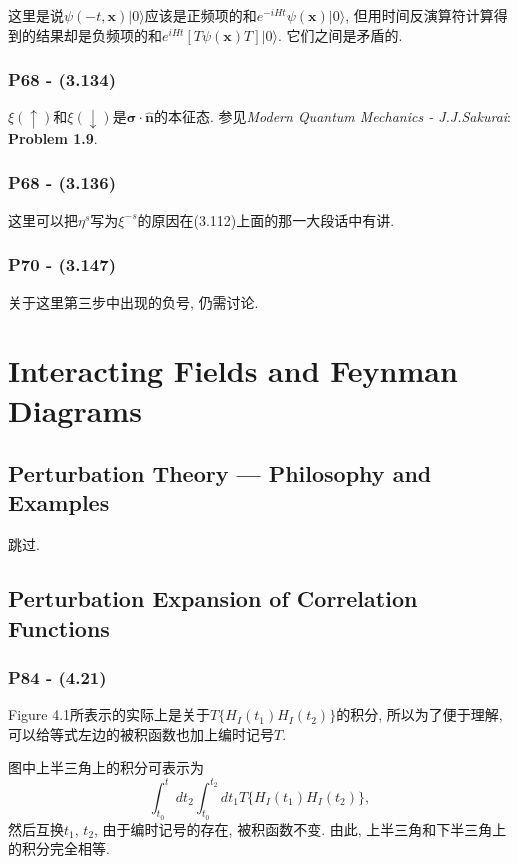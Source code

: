\documentclass[cn,hazy,green,11pt,device=normal,chinesefont=founder]{elegantnote}
\begin{document}
这里是说$\psi(-t, \mathbf{x})|0\rangle$应该是正频项的和$e^{-iHt}\psi(\mathbf{x})|0\rangle$, 但用时间反演算符计算得到的结果却是负频项的和$e^{iHt}[T\psi(\mathbf{x})T]|0\rangle$. 它们之间是矛盾的. 

\subsubsection{P68 - (3.134)}

$\xi(\uparrow)$和$\xi(\downarrow)$是$\boldsymbol{\sigma}\cdot\mathbf{\hat{n}}$的本征态. 参见\textit{Modern Quantum Mechanics - J.J.Sakurai}: \textbf{Problem 1.9}. 

\subsubsection{P68 - (3.136)}

这里可以把$\eta^s$写为$\xi^{-s}$的原因在(3.112)上面的那一大段话中有讲.

\subsubsection{P70 - (3.147)}

关于这里第三步中出现的负号, 仍需讨论. 

\clearpage

\section{Interacting Fields and Feynman Diagrams}

\subsection{Perturbation Theory --- Philosophy and Examples}

跳过. 

\subsection{Perturbation Expansion of Correlation Functions}

\subsubsection{P84 - (4.21)}

Figure 4.1所表示的实际上是关于$T\{H_I(t_1) H_I(t_2)\}$的积分, 所以为了便于理解, 可以给等式左边的被积函数也加上编时记号$T$. 

图中上半三角上的积分可表示为
\begin{equation}
  \int_{t_0}^{t} dt_2 \int_{t_0}^{t_2} dt_1 T\{H_I(t_1) H_I(t_2)\}, 
\end{equation}
然后互换$t_1$, $t_2$, 由于编时记号的存在, 被积函数不变. 由此, 上半三角和下半三角上的积分完全相等. 
\end{document}
